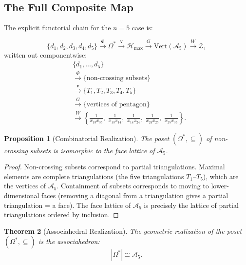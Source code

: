 \documentclass[12pt, oneside]{amsart}
\theoremstyle{plain}
\newtheorem{theorem}{Theorem}[section]
\newtheorem{proposition}[theorem]{Proposition}
\theoremstyle{definition}
\theoremstyle{remark}
\newcommand{\Phif}{\Phi}   %
\newcommand{\OmKS}{\Omega}
\newcommand{\Hmax}{\mathcal{H}_{\max}}
\begin{document}
\subsection{The Full Composite Map}

The explicit functorial chain for the $n=5$ case is:

\begin{equation}
\label{eq:composite-map}
  \{d_1,d_2,d_3,d_4,d_5\} \xrightarrow{\Phif} \OmKS^* \xrightarrow{\mathbf{v}} \Hmax \xrightarrow{G} \mathrm{Vert}(\mathcal{A}_5) \xrightarrow{W} \mathcal{Z},
\end{equation}
written out componentwise:
\begin{align*}
&\{d_1,\ldots,d_5\} \\
&\xrightarrow{\Phif} \{\text{non-crossing subsets}\} \\
&\xrightarrow{\mathbf{v}} \{T_1, T_2, T_3, T_4, T_5\} \\
&\xrightarrow{G} \{\text{vertices of pentagon}\} \\
&\xrightarrow{W} \left\{\frac{1}{x_{13}x_{35}},\; \frac{1}{x_{13}x_{14}},\; \frac{1}{x_{14}x_{24}},\; \frac{1}{x_{24}x_{25}},\; \frac{1}{x_{25}x_{35}}\right\}.
\end{align*}

\begin{proposition}[Combinatorial Realization]
The poset $(\OmKS^*, \subseteq)$ of non-crossing subsets is isomorphic to the face lattice of $\mathcal{A}_5$.
\end{proposition}

\begin{proof}
Non-crossing subsets correspond to partial triangulations. Maximal elements are complete triangulations (the five triangulations $T_1$--$T_5$), which are the vertices of $\mathcal{A}_5$. Containment of subsets corresponds to moving to lower-dimensional faces (removing a diagonal from a triangulation gives a partial triangulation = a face). The face lattice of $\mathcal{A}_5$ is precisely the lattice of partial triangulations ordered by inclusion.
\end{proof}

\begin{theorem}[Associahedral Realization]
The geometric realization of the poset $(\OmKS^*, \subseteq)$ is the associahedron:
\[
  |\OmKS^*| \cong \mathcal{A}_5.
\]
\end{theorem}
\end{document}
